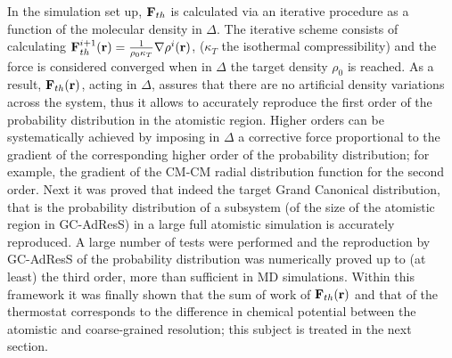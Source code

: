\documentclass[a4paper,preprint,unsortedaddress]{revtex4-1}
\begin{document}
 In the simulation set up, ${\bf F}_{th}$ is calculated via an iterative procedure as a function of the molecular density in $\Delta$. The iterative scheme consists of calculating ${\bf F}^{i+1}_{th}({\bf r})=\frac{1}{\rho_{0}\kappa_{T}}\nabla \rho^{i}({\bf r})$, ($\kappa_{T}$ the isothermal compressibility) and the force is considered converged when in $\Delta$ the target density $\rho_{0}$ is reached. As a result, ${\bf F}_{th}({\bf r})$, acting in $\Delta$, assures that there are no artificial density variations across the system, thus it allows to accurately reproduce the first order of the probability distribution in the atomistic region. Higher orders can be systematically achieved by imposing in $\Delta$ a corrective force proportional to the gradient of the corresponding higher order of the probability distribution; for example, the gradient of the CM-CM radial distribution function for the second order. Next it was proved that indeed the target Grand Canonical distribution, that is the probability distribution of a subsystem (of the size of the atomistic region in GC-AdResS) in a large full atomistic simulation is accurately reproduced. A large number of tests were performed and the reproduction by GC-AdResS of the probability distribution was numerically proved up to (at least) the third order, more than sufficient in MD simulations. Within this framework it was finally shown that the sum of work of ${\bf F}_{th}({\bf r})$ and that of the thermostat corresponds to the difference in chemical potential between the atomistic and coarse-grained resolution; this subject is treated in the next section.
\end{document}
